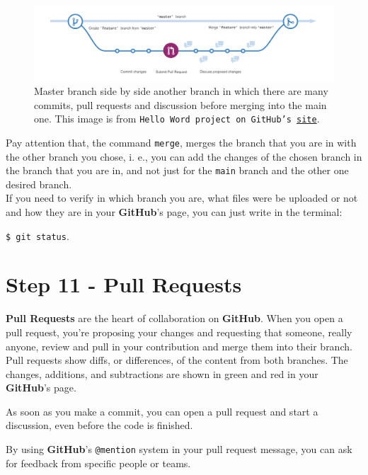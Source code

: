 \documentclass[12pt,a4paper,titlepage,brazil]{article}
\begin{document}
{\begin{figure}[h!]
 \centering 
 \includegraphics[scale=0.24]{branching.png}
 \caption{Master branch side by side another branch in which there are many commits, pull requests and discussion before merging into the main one. This image is from \texttt{Hello Word project on GitHub's \href{https://guides.github.com/activities/hello-world/branching.png}{site}}.}
\end{figure}

Pay attention that, the command \texttt{merge}, merges the branch that you are in with the other branch you chose, i. e., you can add the changes of the chosen branch in the branch that you are in, and not just for the \texttt{main} branch and the other one desired branch.\\

If you need to verify in which branch you are, what files were be uploaded or not and how they are in your {\bf GitHub}'s page, you can just write in the terminal:

\texttt{\$ git status}.


\section{Step 11 - Pull Requests}

{\bf Pull Requests} are the heart of collaboration on {\bf GitHub}. When you open a pull request, you’re proposing your changes and requesting that someone, really anyone, review and pull in your contribution and merge them into their branch. Pull requests show diffs, or differences, of the content from both branches. The changes, additions, and subtractions are shown in {\color{green}green} and {\color{red}red} in your {\bf GitHub}'s page.

As soon as you make a commit, you can open a pull request and start a discussion, even before the code is finished.

By using {\bf GitHub}’s \texttt{@mention} system in your pull request message, you can ask for feedback from specific people or teams.

}
\end{document}
